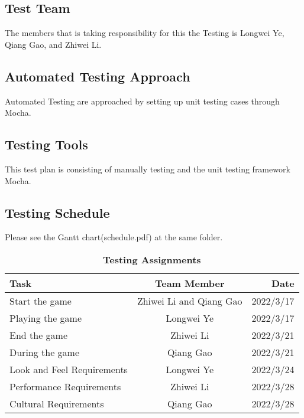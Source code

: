 \documentclass[12pt, titlepage]{article}
\begin{document}
\subsection{Test Team}
The members that is taking responsibility for this the Testing is Longwei Ye, Qiang Gao, and Zhiwei Li.

\subsection{Automated Testing Approach}
Automated Testing are approached by setting up unit testing cases through Mocha.

\subsection{Testing Tools}
This test plan is consisting of manually testing and the unit testing framework Mocha.

\subsection{Testing Schedule}
Please see the Gantt chart(schedule.pdf) at the same folder.

\begin{table}[!htbp]
    \centering

	\begin{tabular}[pos]{|l|c|r|}
		
		\hline
		\textbf{Task} &  \textbf{Team Member}&\textbf{Date} \\ \hline
		Start the game & Zhiwei Li and Qiang Gao & 2022/3/17\\ \hline
		Playing the game & Longwei Ye & 2022/3/17\\ \hline
		End the game & Zhiwei Li & 2022/3/21
	\\ \hline
		During the game & Qiang Gao & 2022/3/21 \\ \hline
		Look and Feel Requirements & Longwei Ye & 2022/3/24 \\ \hline
		Performance Requirements & Zhiwei Li & 2022/3/28 \\ \hline
		Cultural Requirements & Qiang Gao & 2022/3/28 \\ \hline
	\end{tabular}
		\caption{\textbf{Testing Assignments}}
		\label{Table 4}	
	
\end{table}	

\newpage
\end{document}
